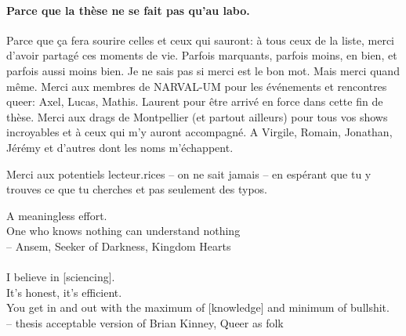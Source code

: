 \paragraph*{Parce que la thèse ne se fait pas qu'au labo.}
Parce que ça fera sourire celles et ceux qui sauront: à tous ceux de la liste, merci d'avoir partagé ces moments de vie. Parfois marquants, parfois moins, en bien, et parfois aussi moins bien. Je ne sais pas si merci est le bon mot. Mais merci quand même.
Merci aux membres de NARVAL-UM pour les événements et rencontres queer: Axel, Lucas, Mathis.
Laurent pour être arrivé en force dans cette fin de thèse.
Merci aux drags de Montpellier (et partout ailleurs) pour tous vos shows incroyables et à ceux qui m'y auront accompagné.
A Virgile, Romain, Jonathan, Jérémy et d'autres dont les noms m'échappent.

\medskip

Merci aux potentiels lecteur.rices -- on ne sait jamais -- en espérant que tu y trouves ce que tu cherches et pas seulement des typos.

\bigskip
\vspace{8cm}

\begin{myepigraph}
A meaningless effort. \\ One who knows nothing can understand nothing \\ -- Ansem, Seeker of Darkness, Kingdom Hearts \\\\[1.5ex]%
I believe in [sciencing].\\ It's honest, it's efficient. \\ You get in and out with the maximum of [knowledge] and minimum of bullshit. \\ -- thesis acceptable version of Brian Kinney, Queer as folk
\end{myepigraph}
